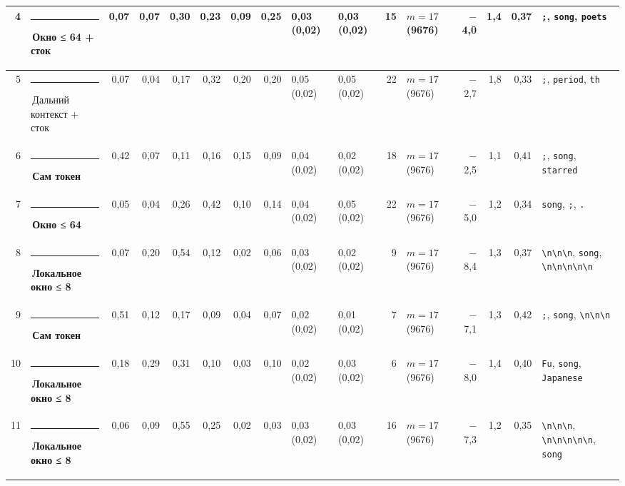 \documentclass[10pt]{article}
\begin{document}
\begin{minipage}{\linewidth}
\begin{center}
{\begin{tabular}{|r|l|r|r|r|r|r|r|l|l|r|l|r|r|r|l|}
4 & \textcolor[HTML]{EDA100}{\rule{0.62em}{0.62em}}\,\textbf{Окно ≤ 64 + сток} & 0,07 & 0,07 & 0,30 & 0,23 & 0,09 & 0,25 & 0,03 (0,02) & 0,03 (0,02) & 15 & $m{=}17$ (9676) & $-$4,0 & 1,4 & 0,37 & \texttt{\textvisiblespace{};}, \texttt{\textvisiblespace{}song}, \texttt{\textvisiblespace{}poets} \\ \hline
5 & \textcolor[HTML]{C3C2B7}{\rule{0.62em}{0.62em}}\,Дальний контекст + сток & 0,07 & 0,04 & 0,17 & 0,32 & 0,20 & 0,20 & 0,05 (0,02) & 0,05 (0,02) & 22 & $m{=}17$ (9676) & $-$2,7 & 1,8 & 0,33 & \texttt{\textvisiblespace{};}, \texttt{\textvisiblespace{}period}, \texttt{th} \\ \hline
6 & \textcolor[HTML]{2A78D6}{\rule{0.62em}{0.62em}}\,\textbf{Сам токен} & 0,42 & 0,07 & 0,11 & 0,16 & 0,15 & 0,09 & 0,04 (0,02) & 0,02 (0,02) & 18 & $m{=}17$ (9676) & $-$2,5 & 1,1 & 0,41 & \texttt{\textvisiblespace{};}, \texttt{\textvisiblespace{}song}, \texttt{\textvisiblespace{}starred} \\ \hline
7 & \textcolor[HTML]{EDA100}{\rule{0.62em}{0.62em}}\,\textbf{Окно ≤ 64} & 0,05 & 0,04 & 0,26 & 0,42 & 0,10 & 0,14 & 0,04 (0,02) & 0,05 (0,02) & 22 & $m{=}17$ (9676) & $-$5,0 & 1,2 & 0,34 & \texttt{\textvisiblespace{}song}, \texttt{\textvisiblespace{};}, \texttt{\textvisiblespace{}.} \\ \hline
8 & \textcolor[HTML]{1BAF7A}{\rule{0.62em}{0.62em}}\,\textbf{Локальное окно ≤ 8} & 0,07 & 0,20 & 0,54 & 0,12 & 0,02 & 0,06 & 0,03 (0,02) & 0,02 (0,02) & 9 & $m{=}17$ (9676) & $-$8,4 & 1,3 & 0,37 & \texttt{\textvisiblespace{}\textbackslash{}n\textbackslash{}n\textbackslash{}n}, \texttt{\textvisiblespace{}song}, \texttt{\textbackslash{}n\textbackslash{}n\textbackslash{}n\textbackslash{}n\textbackslash{}n} \\ \hline
9 & \textcolor[HTML]{2A78D6}{\rule{0.62em}{0.62em}}\,\textbf{Сам токен} & 0,51 & 0,12 & 0,17 & 0,09 & 0,04 & 0,07 & 0,02 (0,02) & 0,01 (0,02) & 7 & $m{=}17$ (9676) & $-$7,1 & 1,3 & 0,42 & \texttt{\textvisiblespace{};}, \texttt{\textvisiblespace{}song}, \texttt{\textvisiblespace{}\textbackslash{}n\textbackslash{}n\textbackslash{}n} \\ \hline
10 & \textcolor[HTML]{1BAF7A}{\rule{0.62em}{0.62em}}\,\textbf{Локальное окно ≤ 8} & 0,18 & 0,29 & 0,31 & 0,10 & 0,03 & 0,10 & 0,02 (0,02) & 0,03 (0,02) & 6 & $m{=}17$ (9676) & $-$8,0 & 1,4 & 0,40 & \texttt{\textvisiblespace{}Fu}, \texttt{\textvisiblespace{}song}, \texttt{\textvisiblespace{}Japanese} \\ \hline
11 & \textcolor[HTML]{1BAF7A}{\rule{0.62em}{0.62em}}\,\textbf{Локальное окно ≤ 8} & 0,06 & 0,09 & 0,55 & 0,25 & 0,02 & 0,03 & 0,03 (0,02) & 0,03 (0,02) & 16 & $m{=}17$ (9676) & $-$7,3 & 1,2 & 0,35 & \texttt{\textvisiblespace{}\textbackslash{}n\textbackslash{}n\textbackslash{}n}, \texttt{\textbackslash{}n\textbackslash{}n\textbackslash{}n\textbackslash{}n\textbackslash{}n}, \texttt{\textvisiblespace{}song} \\ \hline

\end{tabular}}
\end{center}
\end{minipage}
\end{document}
